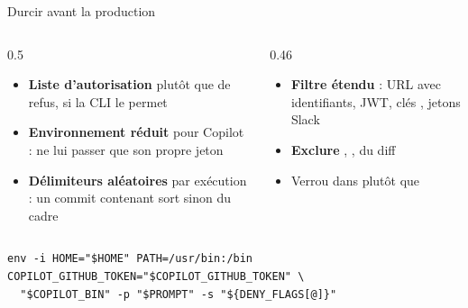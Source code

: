 \documentclass[aspectratio=169,10pt,t]{beamer}
\begin{document}
\begin{frame}[fragile]{Durcir avant la production}
\begin{columns}[T]\begin{column}{0.5\textwidth}
\begin{itemize}
\item \textbf{Liste d'autorisation} plut\^ot que de refus, si la CLI le permet
\item \textbf{Environnement r\'eduit} pour Copilot : ne lui passer que son propre jeton
\item \textbf{D\'elimiteurs al\'eatoires} par ex\'ecution : un commit contenant  sort sinon du cadre
\end{itemize}
\end{column}\begin{column}{0.46\textwidth}
\begin{itemize}
\item \textbf{Filtre \'etendu} : URL avec identifiants, JWT, cl\'es , jetons Slack
\item \textbf{Exclure} , ,  du diff
\item Verrou dans  plut\^ot que 
\end{itemize}
\end{column}\end{columns}
\begin{lstlisting}[style=term]
env -i HOME="$HOME" PATH=/usr/bin:/bin COPILOT_GITHUB_TOKEN="$COPILOT_GITHUB_TOKEN" \
  "$COPILOT_BIN" -p "$PROMPT" -s "${DENY_FLAGS[@]}"
\end{lstlisting}
\end{frame}

\end{document}
